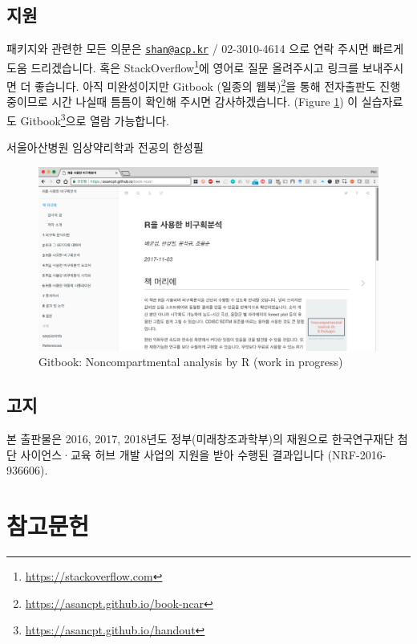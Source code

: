 \documentclass[9pt,]{krantz}
\begin{document}
\hypertarget{section-2}{%
\section{지원}\label{section-2}}

패키지와 관련한 모든 의문은 \href{mailto:shan@acp.kr}{\nolinkurl{shan@acp.kr}} / 02-3010-4614 으로 연락 주시면 빠르게 도움 드리겠습니다.
혹은 StackOverflow\footnote{\url{https://stackoverflow.com}}에 영어로 질문 올려주시고 링크를 보내주시면 더 좋습니다.
아직 미완성이지만 Gitbook (일종의 웹북)\footnote{\url{https://asancpt.github.io/book-ncar}}을 통해 전자출판도 진행 중이므로 시간 나실때 틈틈이 확인해 주시면 감사하겠습니다. (Figure \ref{fig:gitbook})
이 실습자료도 Gitbook\footnote{\url{https://asancpt.github.io/handout}}으로 열람 가능합니다.

서울아산병원 임상약리학과 전공의 한성필

\begin{figure}
\includegraphics[width=17.74in]{assets/gitbook} \caption{Gitbook: Noncompartmental analysis by R (work in progress)}\label{fig:gitbook}
\end{figure}

\hypertarget{section-3}{%
\section{고지}\label{section-3}}

본 출판물은 2016, 2017, 2018년도 정부(미래창조과학부)의 재원으로 한국연구재단 첨단 사이언스·교육 허브 개발 사업의 지원을 받아 수행된 결과입니다 (NRF-2016-936606).

\hypertarget{references}{%
\chapter{참고문헌}\label{references}}
\end{document}
